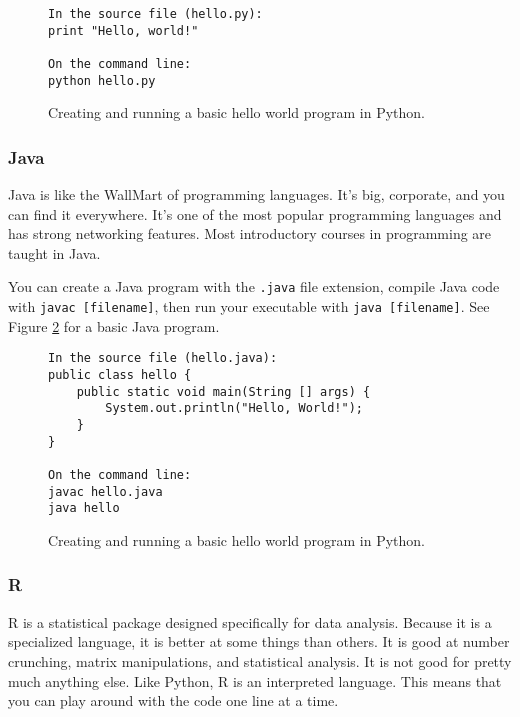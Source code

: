 \documentclass[a4paper]{article}
\begin{document}
\begin{figure}
\begin{center}
\begin{verbatim}
In the source file (hello.py):
print "Hello, world!"

On the command line:
python hello.py
\end{verbatim}
\caption{\label{fig:phello} Creating and running a basic hello world program in Python.}
\end{center}\end{figure}


\subsubsection{Java}
Java is like the WallMart of programming languages. It's big, corporate, and you can find it everywhere. It's one of the most popular programming languages and has strong networking features. Most introductory courses in programming are taught in Java.

You \ex can create a Java program with the \texttt{.java} file extension, compile Java code with \texttt{javac [filename]}, then run your executable with \texttt{java [filename]}. See Figure \ref{fig:jhello} for a basic Java program.

\begin{figure}
\begin{center}
\begin{verbatim}
In the source file (hello.java):
public class hello {
    public static void main(String [] args) {
        System.out.println("Hello, World!");
    }
}

On the command line:
javac hello.java
java hello
\end{verbatim}
\caption{\label{fig:jhello} Creating and running a basic hello world program in Python.}
\end{center}\end{figure}



\subsubsection{R}
R is a statistical package designed specifically for data analysis. Because it is a specialized language, it is better at some things than others. It is good at number crunching, matrix manipulations, and statistical analysis. It is not good for pretty much anything else. Like Python, R is an interpreted language. This means that you can play around with the code one line at a time.
\end{document}
